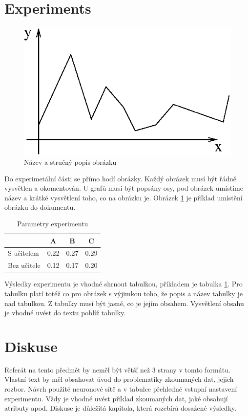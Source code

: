 \documentclass[journal]{IEEEtrancz}
\begin{document}
\section{Experiments}



\begin{figure}[ht]
  \centering
    \includegraphics{figure}
      \caption{Název a stručný popis obrázku}
    \label{fig:exfig}
\end{figure}

Do experimetální části se přímo hodí obrázky. Každý obrázek musí být řádně vysvětlen
a okomentován. U grafů musí být popsány osy, pod obrázek umístíme název a 
krátké vysvětlení toho, co na obrázku je. Obrázek \ref{fig:exfig} je příklad
umístění obrázku do dokumentu.

\begin{table}
  \centering
  \caption{Parametry experimentu}
  \begin{tabular}{|l||c|c|c|}
  \hline
    & A & B & C \\
  \hline
  \hline
  S učitelem  & 0.22 & 0.27 & 0.29 \\
  \hline
  Bez učitele & 0.12 & 0.17 & 0.20 \\ 
  \hline
  \end{tabular}
  \label{tab:extab}
\end{table}

Výsledky experimentu je vhodné shrnout tabulkou, příkladem
je tabulka \ref{tab:extab}. Pro tabulku platí totéž co 
pro obrázek s výjimkou toho, že popis a název tabulky je nad tabulkou. Z tabulky
musí být jasné, co je jejím obsahem. Vysvětlení obsahu je vhodné uvést 
do textu poblíž tabulky.

\section{Diskuse}
Referát na tento předmět by neměl být větší než 3 strany v tomto formátu. 
Vlastní text by měl obsahovat úvod do problematiky zkoumaných dat, jejich rozbor. Návrh
použité neuronové sítě a v tabulce přehledné vstupní nastavení experimentu. Vždy je vhodné
uvést příklad zkoumaných dat, jaké obsahují atributy apod. Diskuse je důležitá kapitola,
která rozebírá dosažené výsledky. 
\end{document}
